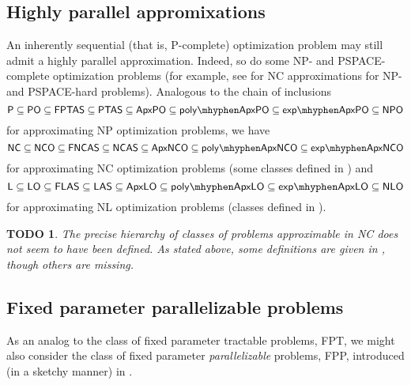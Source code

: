 \documentclass{article}
\newtheorem{todo}{TODO}
\begin{document}
\subsection{Highly parallel appromixations}

An inherently sequential (that is, \textsf{P}-complete) optimization problem may still admit a highly parallel approximation.
Indeed, so do some \textsf{NP}- and \textsf{PSPACE}-complete optimization problems (for example, see \cite{hmrrrs98} for \textsf{NC} approximations for \textsf{NP}- and \textsf{PSPACE}-hard problems).
Analogous to the chain of inclusions
\begin{displaymath}
  \mathsf{P} \subseteq \mathsf{PO} \subseteq \mathsf{FPTAS} \subseteq \mathsf{PTAS} \subseteq \mathsf{ApxPO} \subseteq \mathsf{poly\mhyphen ApxPO} \subseteq \mathsf{exp\mhyphen ApxPO} \subseteq \mathsf{NPO}
\end{displaymath}
for approximating \textsf{NP} optimization problems, we have
\begin{displaymath}
  \mathsf{NC} \subseteq \mathsf{NCO} \subseteq \mathsf{FNCAS} \subseteq \mathsf{NCAS} \subseteq \mathsf{ApxNCO} \subseteq \mathsf{poly\mhyphen ApxNCO} \subseteq \mathsf{exp\mhyphen ApxNCO}
\end{displaymath}
for approximating \textsf{NC} optimization problems (some classes defined in \cite{dsst97}) and
\begin{displaymath}
  \mathsf{L} \subseteq \mathsf{LO} \subseteq \mathsf{FLAS} \subseteq \mathsf{LAS} \subseteq \mathsf{ApxLO} \subseteq \mathsf{poly\mhyphen ApxLO} \subseteq \mathsf{exp\mhyphen ApxLO} \subseteq \mathsf{NLO}
\end{displaymath}
for approximating \textsf{NL} optimization problems (classes defined in \cite{tantau07}).

\begin{todo}
  The precise hierarchy of classes of problems approximable in \textsl{\textsf{NC}}{} does not seem to have been defined.
  As stated above, some definitions are given in \cite{dsst97}, though others are missing.
\end{todo}

\subsection{Fixed parameter parallelizable problems}

As an analog to the class of fixed parameter tractable problems, \textsf{FPT}, we might also consider the class of fixed parameter \emph{parallelizable} problems, \textsf{FPP}, introduced (in a sketchy manner) in \cite{cd98}.
\end{document}
